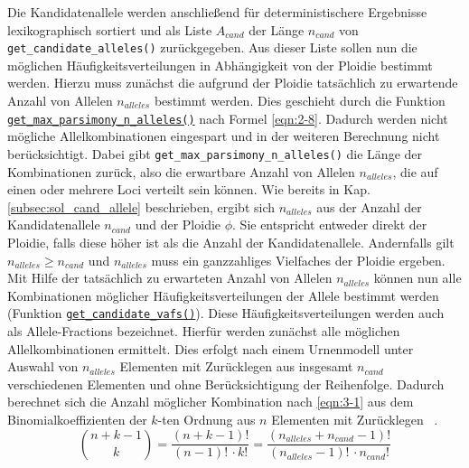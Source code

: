Die Kandidatenallele werden anschließend für deterministischere Ergebnisse lexikographisch sortiert und als Liste $ A_{cand} $ der Länge $ n_{cand} $ von \lstinline|get_candidate_alleles()| zurückgegeben. Aus dieser Liste sollen nun die möglichen Häufigkeitsverteilungen in Abhängigkeit von der Ploidie bestimmt werden. Hierzu muss zunächst die aufgrund der Ploidie tatsächlich zu erwartende Anzahl von Allelen $n_{alleles}$ bestimmt werden. Dies geschieht durch die Funktion \hyperref[schritt7]{\lstinline|get_max_parsimony_n_alleles()|\label{schritt7txt}} nach Formel \eqref{eqn:2-8}. Dadurch werden nicht mögliche Allelkombinationen eingespart und in der weiteren Berechnung nicht berücksichtigt. Dabei gibt \lstinline|get_max_parsimony_n_alleles()| die Länge der Kombinationen zurück, also die erwartbare Anzahl von Allelen $n_{alleles}$, die auf einen oder mehrere Loci verteilt sein können. Wie bereits in Kap. \ref{subsec:sol_cand_allele} beschrieben, ergibt sich $n_{alleles}$ aus der Anzahl der Kandidatenallele $n_{cand}$ und der Ploidie $\phi$. Sie entspricht entweder direkt der Ploidie, falls diese höher ist als die Anzahl der Kandidatenallele. Andernfalls gilt $n_{alleles} \geq n_{cand}$ und $n_{alleles}$ muss ein ganzzahliges Vielfaches der Ploidie ergeben. \\

Mit Hilfe der tatsächlich zu erwarteten Anzahl von Allelen $ n_{alleles} $ können nun alle Kombinationen möglicher Häufigkeitsverteilungen der Allele bestimmt werden (Funktion \hyperref[schritt8]{\lstinline|get_candidate_vafs()|\label{schritt8txt}}). Diese Häufigkeitsverteilungen werden auch als Allele-Fractions bezeichnet. Hierfür werden zunächst alle möglichen Allelkombinationen ermittelt. Dies erfolgt nach einem Urnenmodell unter Auswahl von $ n_{alleles} $ Elementen mit Zurücklegen aus insgesamt $ n_{cand} $ verschiedenen Elementen und ohne Berücksichtigung der Reihenfolge. Dadurch berechnet sich die Anzahl möglicher Kombination nach \eqref{eqn:3-1} aus dem  Binomialkoeffizienten der $k$-ten Ordnung aus $ n $ Elementen mit Zurücklegen ~\cite{tb_stat,bronst}.
\begin{equation} \label{eqn:3-1}
\tag{3-1}
\binom{n + k - 1}{k} = \frac{(n+k-1)!}{(n-1)!\, \cdotp k!} = \frac{(n_{alleles}+n_{cand}-1)!}{(n_{alleles}-1)!\, \cdotp n_{cand}!} 
\end{equation}

